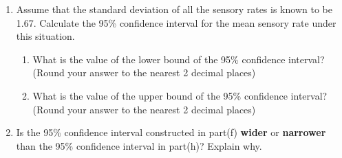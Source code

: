 \begin{enumerate}
      \item Assume that the standard deviation of all the sensory rates is known to be 1.67. %
       Calculate the 95\% confidence interval for the mean sensory rate under this situation. 
      \begin{enumerate}
      \item What is the value of the lower bound of the 95\% confidence interval? (Round your answer to the nearest 2 decimal places) 
      \item What is the value of the upper bound of the 95\% confidence interval? (Round your answer to the nearest 2 decimal places)\\
      \end{enumerate}
      \item Is the 95\% confidence interval constructed in part(f) \textbf{wider} or \textbf{narrower} than the 95\% confidence interval in part(h)? Explain why.\\ %



\end{enumerate}

